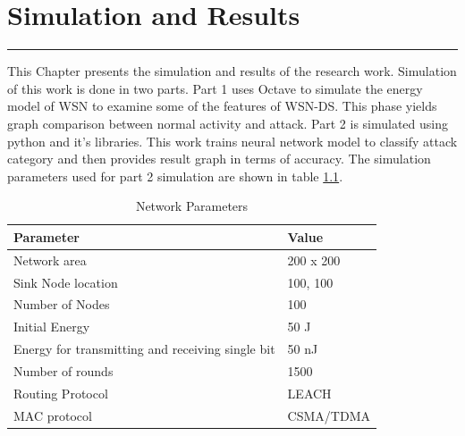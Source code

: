 \chapter{Simulation and Results}
\label{C6} %
\graphicspath{{Figures/PDF/}{Figures/PNG}}
\noindent\rule{\linewidth}{2pt}
This Chapter presents the simulation and results of the research work. Simulation of this work is done in two parts. Part 1 uses Octave to simulate the energy model of WSN to examine some of the features of WSN-DS. This phase yields graph comparison between normal activity and attack. Part 2 is simulated using python and it's libraries. This work trains neural network model to classify attack category and then provides result graph in terms of accuracy. The simulation parameters used for part 2 simulation are shown in table \ref{tab:NetPar}.
\begin{table}[bp]
\centering
\caption{Network Parameters}
\label{tab:NetPar}
\begin{tabular}{|l|l|}
\hline
\textbf{Parameter} & \textbf{Value} \\ \hline
Network area & 200 x 200 \\ \hline
Sink Node location & 100, 100 \\ \hline
Number of Nodes & 100 \\ \hline
Initial Energy & 50 J \\ \hline
Energy for transmitting and receiving single bit & 50 nJ \\ \hline
Number of rounds & 1500 \\ \hline
Routing Protocol & LEACH \\ \hline
MAC protocol & CSMA/TDMA \\ \hline
\end{tabular}%
\end{table}
